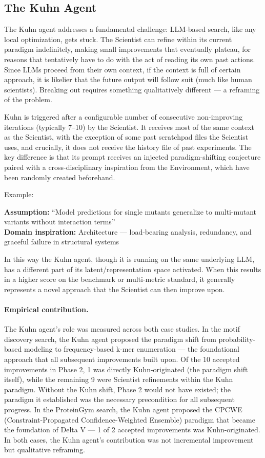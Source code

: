 \documentclass[11pt,a4paper]{article}
\begin{document}
\subsection{The Kuhn Agent}

The Kuhn agent addresses a fundamental challenge: LLM-based search, like any local optimization, gets stuck. The Scientist can refine within its current paradigm indefinitely, making small improvements that eventually plateau, for reasons that tentatively have to do with the act of reading its own past actions. Since LLMs proceed from their own context, if the context is full of certain approach, it is likelier that the future output will follow suit (much like human scientists). Breaking out requires something qualitatively different --- a reframing of the problem.

Kuhn is triggered after a configurable number of consecutive non-improving iterations (typically 7--10) by the Scientist. It receives most of the same context as the Scientist, with the exception of some past scratchpad files the Scientist uses, and crucially, it does not receive the history file of past experiments. The key difference is that its prompt receives an injected paradigm-shifting conjecture paired with a cross-disciplinary inspiration from the Environment, which have been randomly created beforehand. 

Example:

  \textbf{Assumption:} ``Model predictions for single mutants generalize to multi-mutant variants without interaction terms''\\
  \textbf{Domain inspiration:} Architecture --- load-bearing analysis, redundancy, and graceful failure in structural systems

In this way the Kuhn agent, though it is running on the same underlying LLM, has a different part of its latent/representation space activated. When this results in a higher score on the benchmark or multi-metric standard, it generally represents a novel approach that the Scientist can then improve upon.

\paragraph{Empirical contribution.} The Kuhn agent's role was measured across both case studies. In the motif discovery search, the Kuhn agent proposed the paradigm shift from probability-based modeling to frequency-based k-mer enumeration --- the foundational approach that all subsequent improvements built upon. Of the 10 accepted improvements in Phase 2, 1 was directly Kuhn-originated (the paradigm shift itself), while the remaining 9 were Scientist refinements within the Kuhn paradigm. Without the Kuhn shift, Phase 2 would not have existed; the paradigm it established was the necessary precondition for all subsequent progress. In the ProteinGym search, the Kuhn agent proposed the CPCWE (Constraint-Propagated Confidence-Weighted Ensemble) paradigm that became the foundation of Delta V --- 1 of 2 accepted improvements was Kuhn-originated. In both cases, the Kuhn agent's contribution was not incremental improvement but qualitative reframing.
\end{document}
